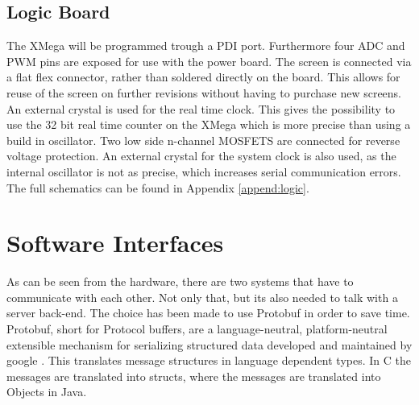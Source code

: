 \subsection{Logic Board}
The XMega will be programmed trough a PDI port. Furthermore four ADC and PWM pins are exposed for use with the power board. The screen is connected via a flat flex connector, rather than soldered directly on the board. This allows for reuse of the screen on further revisions without having to purchase new screens.\newpar
An external crystal is used for the real time clock. This gives the possibility to use the 32 bit real time counter on the XMega which is more precise than using a build in oscillator. Two low side n-channel MOSFETS are connected for reverse voltage protection. An external crystal for the system clock is also used, as the internal oscillator is not as precise, which increases serial communication errors.\newpar
The full schematics can be found in Appendix \ref{append:logic}.

\section{Software Interfaces}
As can be seen from the hardware, there are two systems that have to communicate with each other. Not only that, but its also needed to talk with a server back-end. The choice has been made to use Protobuf in order to save time. Protobuf, short for Protocol buffers, are a language-neutral, platform-neutral extensible mechanism for serializing structured data developed and maintained by google \cite{github:gpb}. This translates message structures in language dependent types. In C the messages are translated into structs, where the messages are translated into Objects in Java.
